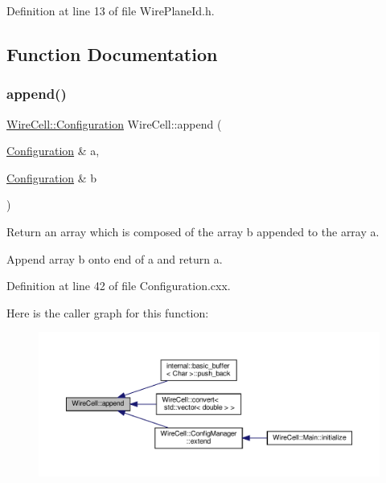 Definition at line 13 of file Wire\+Plane\+Id.\+h.



\subsection{Function Documentation}
\mbox{\label{namespace_wire_cell_acbed381be380ba3a92f80dc5bbcac91f}} 
\subsubsection{\texorpdfstring{append()}{append()}}
{\footnotesize\ttfamily \hyperlink{namespace_wire_cell_a9f705541fc1d46c608b3d32c182333ee}{Wire\+Cell\+::\+Configuration} Wire\+Cell\+::append (\begin{DoxyParamCaption}\item[{\hyperlink{namespace_wire_cell_a9f705541fc1d46c608b3d32c182333ee}{Configuration} \&}]{a,  }\item[{\hyperlink{namespace_wire_cell_a9f705541fc1d46c608b3d32c182333ee}{Configuration} \&}]{b }\end{DoxyParamCaption})}



Return an array which is composed of the array b appended to the array a. 

Append array b onto end of a and return a. 

Definition at line 42 of file Configuration.\+cxx.

Here is the caller graph for this function\+:
\nopagebreak
\begin{figure}[H]
\begin{center}
\leavevmode
\includegraphics[width=350pt]{namespace_wire_cell_acbed381be380ba3a92f80dc5bbcac91f_icgraph}
\end{center}
\end{figure}
\mbox{\label{namespace_wire_cell_a3e32120de947bdb96c9d47747170d90d}} 

